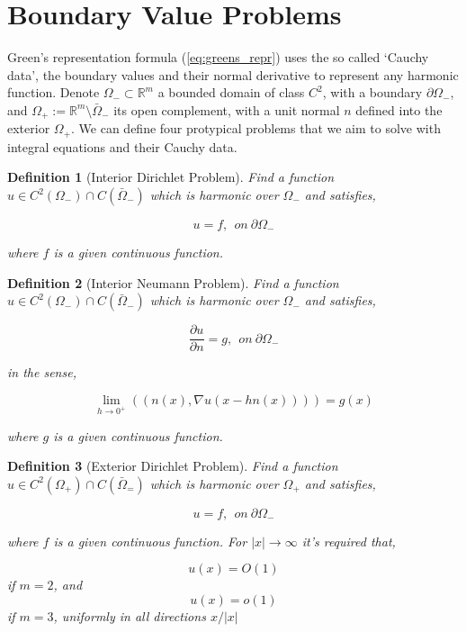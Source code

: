 \documentclass[12pt, a4, twoside]{article}
\newtheorem{definition}{Definition}[section]
\begin{document}
\section{Boundary Value Problems}

Green's representation formula (\ref{eq:greens_repr}) uses the so called `Cauchy data', the boundary values and their normal derivative to represent any harmonic function. Denote $\Omega_- \subset \mathbb{R}^m$ a bounded domain of class $C^2$, with a boundary $\partial \Omega_-$, and $\Omega_+ := \mathbb{R}^m \setminus \bar{\Omega}_-$ its open complement, with a unit normal $n$ defined into the exterior $\Omega_+$. We can define four protypical problems that we aim to solve with integral equations and their Cauchy data.

\begin{definition}[Interior Dirichlet Problem]
    \label{def:int_dir_prob}
    Find a function $u \in C^2(\Omega_-) \cap C(\bar{\Omega}_-)$ which is harmonic over $\Omega_-$ and satisfies,

    $$ u = f, \> \> on \> \partial \Omega_- $$ 

    where $f$ is a given continuous function.

\end{definition}

\begin{definition}[Interior Neumann Problem]
    \label{def:int_neu_prob}
    Find a function $u \in C^2(\Omega_-) \cap C(\bar{\Omega}_-)$ which is harmonic over $\Omega_-$ and satisfies,

    $$ \frac{\partial u}{\partial n} = g, \> \> on \>  \partial \Omega_- $$ 

    in the sense,

    $$ \lim_{h \rightarrow 0^+} ((n(x), \nabla u(x-hn(x)))) = g(x) $$

    where $g$ is a given continuous function.

\end{definition}

\begin{definition}[Exterior Dirichlet Problem]
    \label{def:ext_dir_prob}
    Find a function $u \in C^2(\Omega_+) \cap C(\bar{\Omega}_=)$ which is harmonic over $\Omega_+$ and satisfies,

    $$ u = f, \> \> on \> \partial \Omega_- $$ 

    where $f$ is a given continuous function. For $|x| \rightarrow \infty$ it's required that,

    $$u(x) = O(1)$$ if $m=2$, and $$u(x)=o(1)$$ if $m=3$, uniformly in all directions $x/|x|$
\end{definition}
\end{document}
